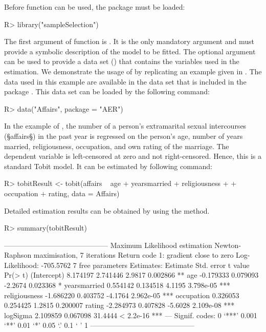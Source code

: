 \documentclass[article,nojss]{jss}
\begin{document}
Before function  can be used,
the  package \citep{toomet08}
must be loaded:
\begin{Schunk}
\begin{Sinput}
R> library("sampleSelection")
\end{Sinput}
\end{Schunk}
The first argument of function  is .
It is the only mandatory argument and
must provide a symbolic description of the model to be fitted.
The optional argument  can be used to provide
a data set ()
that contains the variables used in the estimation.
We demonstrate the usage of  by replicating an example
given in \citet[p.~142]{kleiber08a}.
The data used in this example are available in the data set 
that is included in the  package 
\citep{kleiber08a,r-aer-1.1}.
This data set can be loaded by the following command:
\begin{Schunk}
\begin{Sinput}
R> data("Affairs", package = "AER")
\end{Sinput}
\end{Schunk}
In the example of \citet[p.~142]{kleiber08a},
the number of a person's extramarital sexual intercourses (§affairs§)
in the past year
is regressed on the person's age, number of years married,
religiousness, occupation, and own rating of the marriage.
The dependent variable is left-censored at zero and not right-censored.
Hence, this is a standard Tobit model.
It can be estimated by following command:
\begin{Schunk}
\begin{Sinput}
R> tobitResult <- tobit(affairs ~ age + yearsmarried + religiousness + 
+     occupation + rating, data = Affairs)
\end{Sinput}
\end{Schunk}
Detailed estimation results can be obtained by using the  method.
\begin{Schunk}
\begin{Sinput}
R> summary(tobitResult)
\end{Sinput}
\begin{Soutput}
--------------------------------------------
Maximum Likelihood estimation
Newton-Raphson maximisation, 7 iterations
Return code 1: gradient close to zero
Log-Likelihood: -705.5762 
7  free parameters
Estimates:
               Estimate Std. error t value   Pr(> t)    
(Intercept)    8.174197   2.741446  2.9817  0.002866 ** 
age           -0.179333   0.079093 -2.2674  0.023368 *  
yearsmarried   0.554142   0.134518  4.1195 3.798e-05 ***
religiousness -1.686220   0.403752 -4.1764 2.962e-05 ***
occupation     0.326053   0.254425  1.2815  0.200007    
rating        -2.284973   0.407828 -5.6028 2.109e-08 ***
logSigma       2.109859   0.067098 31.4444 < 2.2e-16 ***
---
Signif. codes:  0 ‘***’ 0.001 ‘**’ 0.01 ‘*’ 0.05 ‘.’ 0.1 ‘ ’ 1 
--------------------------------------------
\end{Soutput}
\end{Schunk}
\end{document}
